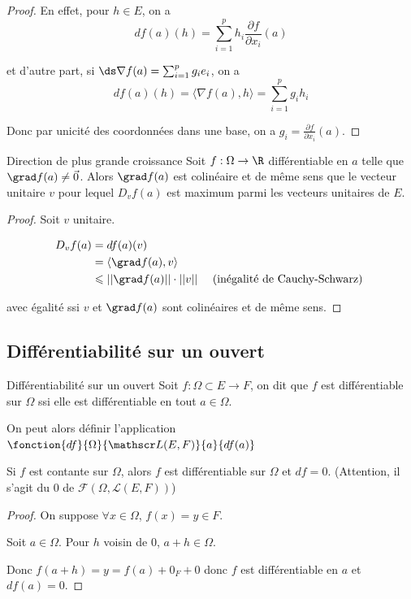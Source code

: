 \begin{proof}
    En effet, pour $h \in E$, on a 
    $$df(a)(h) = \sum_{i = 1 }^{p } h_i \frac{\partial f}{\partial x_i} (a)$$

    et d'autre part, si $\ds \nabla f(a) = \sum_{i = 1 }^{p } g_i e_i$, on a 
    $$df(a)(h) = \langle \nabla f(a), h \rangle = \sum_{i = 1 }^{p } g_i h_i$$

    Donc par unicité des coordonnées dans une base, on a $g_i = \frac{\partial f}{\partial x_i} (a)$.
\end{proof}

\begin{proposition}{Direction de plus grande croissance}{}
    Soit $f : \Omega \to \R$ différentiable en $a$ telle que 
    $\grad f(a) \neq \vec 0$. Alors $\grad f(a)$ est colinéaire et de même sens 
    que le vecteur unitaire $v$ pour lequel $D_v f(a)$ est maximum parmi les vecteurs unitaires de $E$.
\end{proposition}


\begin{proof}
    Soit $v$ unitaire. 

    \begin{align}
        D_v f(a) & = df(a)(v) \\
        & = \langle \grad f(a), v \rangle \\
        & \leqslant ||\grad f(a)|| \cdot ||v|| \quad \text{ (inégalité de Cauchy-Schwarz) } \\
    \end{align}

    avec égalité ssi $v$ et $\grad f(a)$ sont colinéaires et de même sens.
\end{proof}

\subsection{Différentiabilité sur un ouvert}

\begin{definition}{Différentiabilité sur un ouvert}{}
    Soit $f : \Omega \subset E \to F$, on dit que $f$ est différentiable sur 
    $\Omega$ ssi elle est différentiable en tout $a \in \Omega$.

    On peut alors définir l'application $\fonction{df}{\Omega}{\mathscr L(E, F)}{a}{df(a)}$
\end{definition}

\begin{exemple}
    Si $f$ est contante sur $\Omega$, alors $f$ est différentiable sur $\Omega$ et 
    $df = 0$. (Attention, il s'agit du $0$ de $\mathscr F(\Omega, \mathscr L(E, F))$)

    \begin{proof}
        On suppose $\forall x \in \Omega$, $f(x) = y \in F$. 

        Soit $a \in \Omega$. Pour $h$ voisin de $0$, $a + h \in \Omega$. 

        Donc $f(a + h) = y = f(a) + 0_F + 0 $ donc $f$ est différentiable en $a$ et $df(a) = 0$.
    \end{proof}
\end{exemple}


